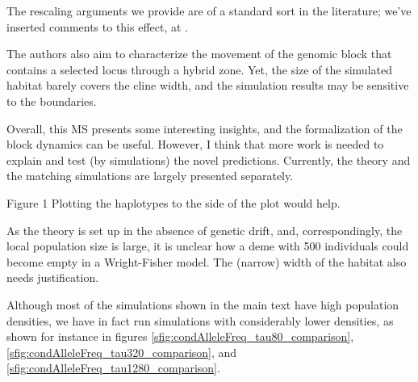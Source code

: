 \reply
{}

The rescaling arguments we provide  are of a standard sort in the literature;
we've inserted comments to this effect, at  .


\begin{point}{}
    The authors also aim to characterize the movement of the genomic block that contains a selected locus through a hybrid zone. Yet, the size of the simulated habitat barely covers the cline width, and the simulation results may be sensitive to the boundaries.

Overall, this MS presents some interesting insights, and the formalization of the block dynamics can be useful. However, I think that more work is needed to explain and test (by simulations) the novel predictions. Currently, the theory and the matching simulations are largely presented separately.
\end{point}

\reply
{}


\begin{point}{Figure 1}
 Plotting the haplotypes to the side of the plot would help.
\end{point}

\reply
{}
 

\begin{point}{\revref}
 As the theory is set up in the absence of genetic drift, and, correspondingly, the local population size is large, it is unclear how a deme with 500 individuals could become empty in a Wright-Fisher model.  The (narrow) width of the habitat also needs justification.
\end{point}

\reply
Although most of the simulations shown in the main text have high population densities,
we have in fact run simulations with considerably lower densities, 
as shown for instance in figures \ref{sfig:condAlleleFreq_tau80_comparison}, \ref{sfig:condAlleleFreq_tau320_comparison}, and \ref{sfig:condAlleleFreq_tau1280_comparison}.

